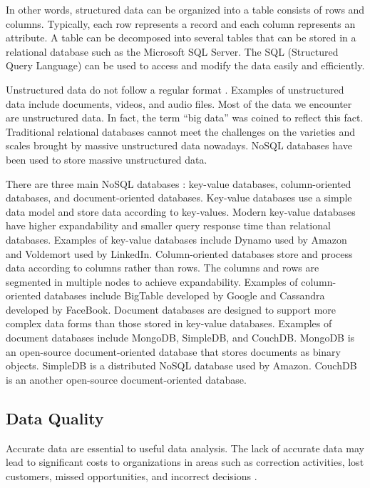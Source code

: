 \documentclass[]{book}
\theoremstyle{definition}
\theoremstyle{definition}
\theoremstyle{definition}
\theoremstyle{remark}
\begin{document}
In other words, structured data can be organized into a table consists
of rows and columns. Typically, each row represents a record and each
column represents an attribute. A table can be decomposed into several
tables that can be stored in a relational database such as the Microsoft
SQL Server. The SQL (Structured Query Language) can be used to access
and modify the data easily and efficiently.

Unstructured data do not follow a regular format
\citep{abdullah2013data}. Examples of unstructured data include
documents, videos, and audio files. Most of the data we encounter are
unstructured data. In fact, the term ``big data'' was coined to reflect
this fact. Traditional relational databases cannot meet the challenges
on the varieties and scales brought by massive unstructured data
nowadays. NoSQL databases have been used to store massive unstructured
data.

There are three main NoSQL databases \citep{chen2014b}: key-value
databases, column-oriented databases, and document-oriented databases.
Key-value databases use a simple data model and store data according to
key-values. Modern key-value databases have higher expandability and
smaller query response time than relational databases. Examples of
key-value databases include Dynamo used by Amazon and Voldemort used by
LinkedIn. Column-oriented databases store and process data according to
columns rather than rows. The columns and rows are segmented in multiple
nodes to achieve expandability. Examples of column-oriented databases
include BigTable developed by Google and Cassandra developed by
FaceBook. Document databases are designed to support more complex data
forms than those stored in key-value databases. Examples of document
databases include MongoDB, SimpleDB, and CouchDB. MongoDB is an
open-source document-oriented database that stores documents as binary
objects. SimpleDB is a distributed NoSQL database used by Amazon.
CouchDB is an another open-source document-oriented database.

\subsection{Data Quality}\label{data-quality}

Accurate data are essential to useful data analysis. The lack of
accurate data may lead to significant costs to organizations in areas
such as correction activities, lost customers, missed opportunities, and
incorrect decisions \citep{olson2003}.
\end{document}
